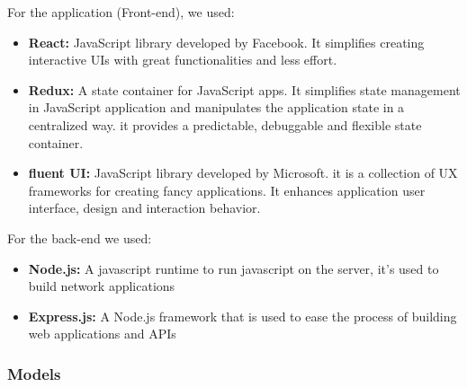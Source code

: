 For the application (Front-end), we used:
\begin{itemize}
    \item \textbf{React: }JavaScript library developed by Facebook. It simplifies creating interactive UIs with great functionalities and less effort.
    \item \textbf{Redux: }A state container for JavaScript apps. It simplifies state management in JavaScript application and manipulates the application state in a centralized way. it provides a predictable, debuggable and flexible state container.
    \item  \textbf{fluent UI: }JavaScript library developed by Microsoft. it is a collection of UX frameworks for creating fancy applications. It enhances application user interface, design and interaction behavior.
\end{itemize}

For the back-end we used:

\begin{itemize}
    \item \textbf{Node.js:} A javascript runtime to run javascript on the server, it's used to build network applications
    \item \textbf{Express.js:} A Node.js framework that is used to ease the process of building web applications and APIs
\end{itemize}

\subsubsection{Models}

